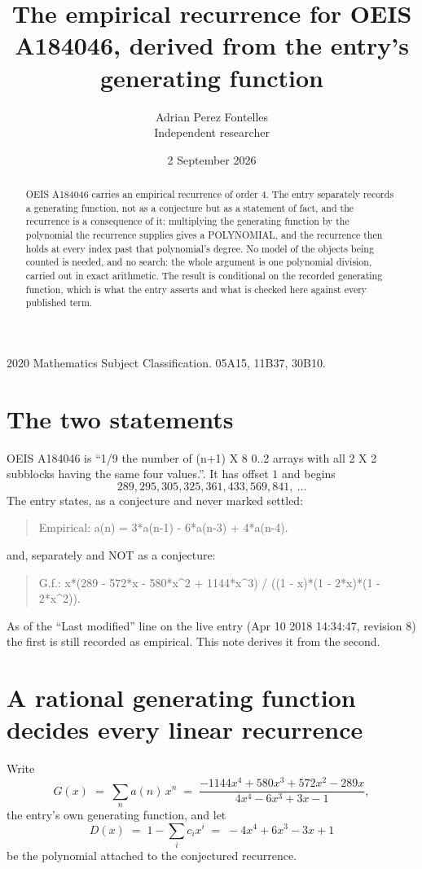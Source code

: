 \documentclass[11pt,a4paper]{article}
\title{The empirical recurrence for OEIS A184046, derived from the entry's generating function}
\author{Adrian Perez Fontelles\\ \small Independent researcher}
\date{2 September 2026}
\theoremstyle{plain}
\theoremstyle{definition}
\begin{document}
\maketitle

\begin{abstract}
OEIS A184046 carries an empirical recurrence of order $4$. The entry separately records a
generating function, not as a conjecture but as a statement of fact, and the recurrence is a
consequence of it: multiplying the generating function by the polynomial the recurrence
supplies gives a POLYNOMIAL, and the recurrence then holds at every index past that
polynomial's degree. No model of the objects being counted is needed, and no search: the
whole argument is one polynomial division, carried out in exact arithmetic. The result is
conditional on the recorded generating function, which is what the entry asserts and what is
checked here against every published term.
\end{abstract}

\noindent\small 2020 Mathematics Subject Classification. 05A15, 11B37, 30B10.\normalsize

\section{The two statements}

OEIS A184046 is ``1/9 the number of (n+1) X 8 0..2 arrays with all 2 X 2 subblocks having the same four values.''. It has offset $1$ and begins
\[
289, 295, 305, 325, 361, 433, 569, 841,\ \dots
\]
The entry states, as a conjecture and never marked settled:
\begin{quote}
Empirical: a(n) = 3*a(n-1) - 6*a(n-3) + 4*a(n-4).
\end{quote}
and, separately and NOT as a conjecture:
\begin{quote}
G.f.: x*(289 - 572*x - 580*x\^{}2 + 1144*x\^{}3) / ((1 - x)*(1 - 2*x)*(1 - 2*x\^{}2)).
\end{quote}
As of the ``Last modified'' line on the live entry (Apr 10 2018 14:34:47, revision 8) the first is still
recorded as empirical. This note derives it from the second.

\section{A rational generating function decides every linear recurrence}

Write
\[
G(x)\;=\;\sum_{n}a(n)\,x^{n}\;=\;\frac{- 1144 x^{4} + 580 x^{3} + 572 x^{2} - 289 x}{4 x^{4} - 6 x^{3} + 3 x - 1},
\]
the entry's own generating function, and let
\[
D(x)\;=\;1-\sum_i c_i x^{i}\;=\;- 4 x^{4} + 6 x^{3} - 3 x + 1
\]
be the polynomial attached to the conjectured recurrence.
\end{document}
